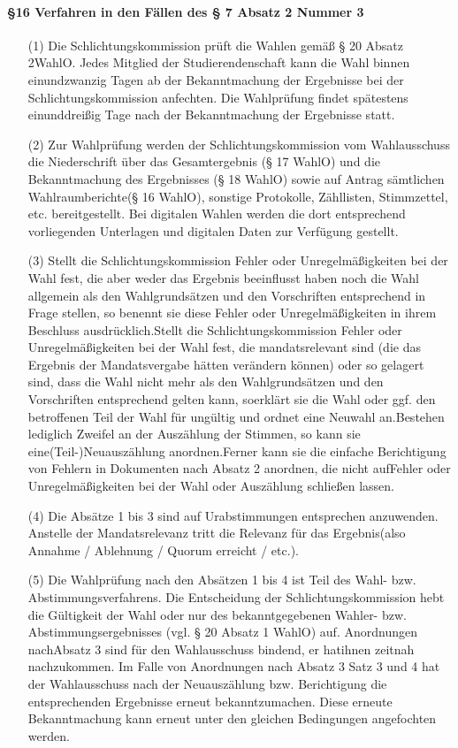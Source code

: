        \paragraph{§16 Verfahren in den Fällen des § 7 Absatz 2 Nummer 3}
            \begin{itemize}
                \item[(1)]    Die Schlichtungskommission prüft die Wahlen gemäß § 20 Absatz 2WahlO. Jedes Mitglied der Studierendenschaft kann die Wahl binnen einundzwanzig Tagen ab der Bekanntmachung der Ergebnisse bei der Schlichtungskommission anfechten. Die Wahlprüfung findet spätestens einunddreißig Tage nach der Bekanntmachung der Ergebnisse statt.
                \item[(2)]    Zur Wahlprüfung werden der Schlichtungskommission vom Wahlausschuss die Niederschrift über das Gesamtergebnis (§ 17 WahlO) und die Bekanntmachung des Ergebnisses (§ 18 WahlO) sowie auf Antrag sämtlichen Wahlraumberichte(§ 16 WahlO), sonstige Protokolle, Zähllisten, Stimmzettel, etc. bereitgestellt. Bei digitalen Wahlen werden die dort entsprechend vorliegenden Unterlagen und digitalen Daten zur Verfügung gestellt.
                \item[(3)]    Stellt die Schlichtungskommission Fehler oder Unregelmäßigkeiten bei der Wahl fest, die aber weder das Ergebnis beeinflusst haben noch die Wahl allgemein als den Wahlgrundsätzen und den Vorschriften entsprechend in Frage stellen, so benennt sie diese Fehler oder Unregelmäßigkeiten in ihrem Beschluss ausdrücklich.Stellt die Schlichtungskommission Fehler oder Unregelmäßigkeiten bei der Wahl fest, die mandatsrelevant sind (die das Ergebnis der Mandatsvergabe hätten verändern können) oder so gelagert sind, dass die Wahl nicht mehr als den Wahlgrundsätzen und den Vorschriften entsprechend gelten kann, soerklärt sie die Wahl oder ggf. den betroffenen Teil der Wahl für ungültig und ordnet eine Neuwahl an.Bestehen lediglich Zweifel an der Auszählung der Stimmen, so kann sie eine(Teil-)Neuauszählung anordnen.Ferner kann sie die einfache Berichtigung von Fehlern in Dokumenten nach Absatz 2 anordnen, die nicht aufFehler oder Unregelmäßigkeiten bei der Wahl oder Auszählung schließen lassen.
                \item[(4)]    Die Absätze 1 bis 3 sind auf Urabstimmungen entsprechen anzuwenden. Anstelle der Mandatsrelevanz tritt die Relevanz für das Ergebnis(also Annahme / Ablehnung / Quorum erreicht / etc.).
                \item[(5)]    Die Wahlprüfung nach den Absätzen 1 bis 4 ist Teil des Wahl- bzw. Abstimmungsverfahrens. Die Entscheidung der Schlichtungskommission hebt die Gültigkeit der Wahl oder nur des bekanntgegebenen Wahler- bzw. Abstimmungsergebnisses (vgl. § 20 Absatz 1 WahlO) auf. Anordnungen nachAbsatz 3 sind für den Wahlausschuss bindend, er hatihnen zeitnah nachzukommen. Im Falle von Anordnungen nach Absatz 3 Satz 3 und 4 hat der Wahlausschuss nach der Neuauszählung bzw. Berichtigung die entsprechenden Ergebnisse erneut bekanntzumachen. Diese erneute Bekanntmachung kann erneut unter den gleichen Bedingungen angefochten werden.
            \end{itemize}
